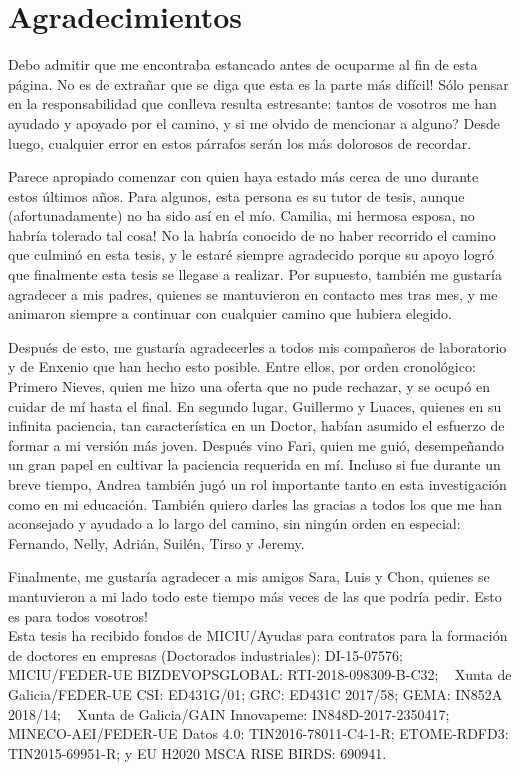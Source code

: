 \chapter*{Agradecimientos}
Debo admitir que me encontraba estancado antes de ocuparme al fin de esta p\'agina. \textexclamdown No es de extra\~nar que se diga que esta es la parte m\'as dif\'icil! S\'olo pensar en la responsabilidad que conlleva resulta estresante: tantos de vosotros me han ayudado y apoyado por el camino, \textquestiondown y si me olvido de mencionar a alguno? Desde luego, cualquier error en estos p\'arrafos ser\'an los m\'as dolorosos de recordar.

Parece apropiado comenzar con quien haya estado m\'as cerca de uno durante estos \'ultimos a\~nos. Para algunos, esta persona es su tutor de tesis, aunque (afortunadamente) no ha sido as\'i en el m\'io. \textexclamdown Camilia, mi hermosa esposa, no habr\'ia tolerado tal cosa! No la habr\'ia conocido de no haber recorrido el camino que culmin\'o en esta tesis, y le estar\'e siempre agradecido porque su apoyo logr\'o que finalmente esta tesis se llegase a realizar. Por supuesto, tambi\'en me gustar\'ia agradecer a mis padres, quienes se mantuvieron en contacto mes tras mes, y me animaron siempre a continuar con cualquier camino que hubiera elegido.

Despu\'es de esto, me gustar\'ia agradecerles a todos mis compa\~neros de laboratorio y de Enxenio que han hecho esto posible. Entre ellos, por orden cronol\'ogico: Primero Nieves, quien me hizo una oferta que no pude rechazar, y se ocup\'o en cuidar de m\'i hasta el final. En segundo lugar, Guillermo y Luaces, quienes en su infinita paciencia, tan caracter\'istica en un Doctor, hab\'ian asumido el esfuerzo de formar a mi versi\'on m\'as joven. Despu\'es vino Fari, quien me gui\'o, desempe\~nando un gran papel en cultivar la paciencia requerida en m\'i. Incluso si fue durante un breve tiempo, Andrea tambi\'en jug\'o un rol importante tanto en esta investigaci\'on como en mi educaci\'on. Tambi\'en quiero darles las gracias a todos  los que me han aconsejado y ayudado a lo largo del camino, sin ning\'un orden en especial: Fernando, Nelly, Adri\'an, Suil\'en, Tirso y Jeremy.

Finalmente, me gustar\'ia agradecer a mis amigos Sara, Luis y Chon, quienes se mantuvieron a mi lado todo este tiempo m\'as veces de las que podr\'ia pedir. \textexclamdown Esto es para todos vosotros!\\

\small{Esta tesis ha recibido fondos de MICIU/Ayudas para contratos para la formaci\'on de doctores en empresas (Doctorados industriales): DI-15-07576; ~ MICIU/FEDER-UE BIZDEVOPSGLOBAL: RTI-2018-098309-B-C32; ~  Xunta de Galicia/FEDER-UE CSI: ED431G/01; GRC: ED431C 2017/58; GEMA: IN852A 2018/14; ~ Xunta de Galicia/GAIN Innovapeme: IN848D-2017-2350417; ~ MINECO-AEI/FEDER-UE Datos 4.0: TIN2016-78011-C4-1-R; ETOME-RDFD3: TIN2015-69951-R; y EU H2020 MSCA RISE BIRDS: 690941.}
